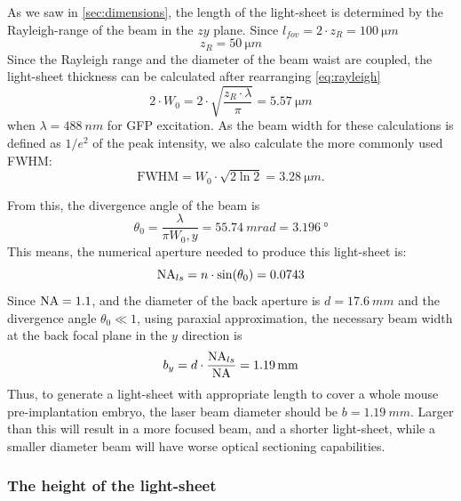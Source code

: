       As we saw in \autoref{sec:dimensions}, the length of the light-sheet is determined by the Rayleigh-range of the beam in the $zy$ plane. Since $l_{fov}=2\cdot z_{R}=\SI{100}{\micro m}$
      \begin{equation}
        z_{R}=\SI{50}{\micro m}
      \end{equation}
      Since the Rayleigh range and the diameter of the beam waist are coupled, the light-sheet thickness can be calculated after rearranging \autoref{eq:rayleigh}
      \begin{equation}
        2\cdot W_{0} = 2\cdot \sqrt{\frac{z_R \cdot \lambda}{\pi}} = \SI{5.57}{\micro m}
      \end{equation}
      when $\lambda=\SI{488}{nm}$ for GFP excitation. As the beam width for these calculations is defined as $1/e^2$ of the peak intensity, we also calculate the more commonly used FWHM:
      \begin{equation}
        \mathrm{FWHM} = W_0 \cdot \sqrt{2 \ln 2} = \SI{3.28}{\micro m}.
      \end{equation}
      
      From this, the divergence angle of the beam is
      \begin{equation}
        \theta_0 = \frac{\lambda}{\pi W_0,y} = \SI{55.74}{mrad} = \SI{3.196}{\degree}
      \end{equation}
      This means, the numerical aperture needed to produce this light-sheet is:
      \begin{equation}
        \operatorname{NA}_{ls} = n\cdot \sin(\theta _0) = 0.0743
      \end{equation}
      Since $\operatorname{NA}=1.1$, and the diameter of the back aperture is $d=\SI{17.6}{mm}$ and the divergence angle $\theta_0 \ll 1$, using paraxial approximation, the necessary beam width at the back focal plane in the $y$ direction is
      \begin{equation}
        b_y = d \cdot \frac{\operatorname{NA}_{ls}}{\operatorname{NA}} = \SI{1.19}{mm}
      \end{equation}
      Thus, to generate a light-sheet with appropriate length to cover a whole mouse pre-implantation embryo, the laser beam diameter should be $b=\SI{1.19}{mm}$. Larger than this will result in a more focused beam, and a shorter light-sheet, while a smaller diameter beam will have worse optical sectioning capabilities.

    \subsubsection{The height of the light-sheet}
    

